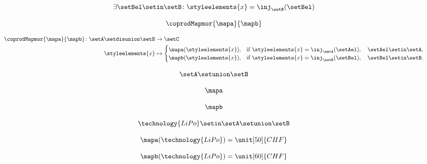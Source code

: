 {\begin{forslides}
    \begin{equation}
        \label{eq:feedback-105}
        \exists \setBel\setin \setB\colon \styleelements{x}=\inj_\setB(\setBel)
    \end{equation}

    \begin{equation}
        \label{eq:feedback-106}
        \coprodMapmor{\mapa}{\mapb}
    \end{equation}

    \begin{equation}
        \label{eq:feedback-107}
        \begin{aligned}
            \coprodMapmor{\mapa}{\mapb} \colon  \setA \setdisunion \setB & \to \setC \\
            \styleelements{x}                                            & \mapsto
            \begin{cases}
                \mapa(\styleelements{x}), & \text{if } \styleelements{x}=\inj_\setA(\setAel),\quad \setAel \setin \setA, \\
                \mapb(\styleelements{x}), & \text{if } \styleelements{x}=\inj_\setB(\setBel),\quad \setBel \setin \setB.
            \end{cases}
        \end{aligned}
    \end{equation}

    \begin{equation}
        \label{eq:feedback-108}
        \setA\setunion \setB
    \end{equation}

    \begin{equation}
        \label{eq:feedback-109}
        \mapa
    \end{equation}

    \begin{equation}
        \label{eq:feedback-110}
        \mapb
    \end{equation}

    \begin{equation}
        \label{eq:feedback-111}
        \technology{LiPo}\setin \setA\setunion \setB
    \end{equation}

    \begin{equation}
        \label{eq:feedback-112}
        \mapa(\technology{LiPo})=\unit[50]{CHF}
    \end{equation}

    \begin{equation}
        \label{eq:feedback-113}
        \mapb(\technology{LiPo})=\unit[60]{CHF}
    \end{equation}


\end{forslides}}
